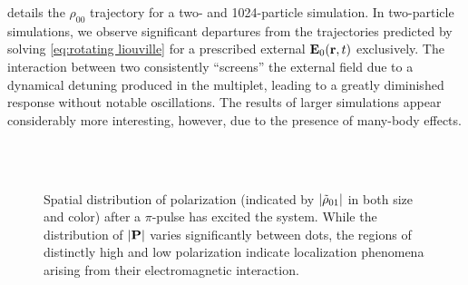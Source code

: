  details the $\rho_{00}$ trajectory for a two- and 1024-particle simulation.
In two-particle simulations, we observe significant departures from the trajectories predicted by solving \cref{eq:rotating liouville} for a prescribed external $\vb{E}_0(\vb{r}, t)$ exclusively.
The interaction between two \qds{} consistently ``screens'' the external field due to a dynamical detuning produced in the multiplet, leading to a greatly diminished response without notable oscillations.
The results of larger simulations appear considerably more interesting, however, due to the presence of many-body effects.

\begin{figure}
  \centering
   \\
   \\

  \caption{\label{fig:polarization vis}Spatial distribution of polarization (indicated by $\abs{\tilde{\rho}_{01}}$ in both size and color) after a $\pi$-pulse has excited the system.
  While the distribution of $\abs{\vb{P}}$ varies significantly between dots, the regions of distinctly high and low polarization indicate localization phenomena arising from their electromagnetic interaction.}
\end{figure}

\lipsum
